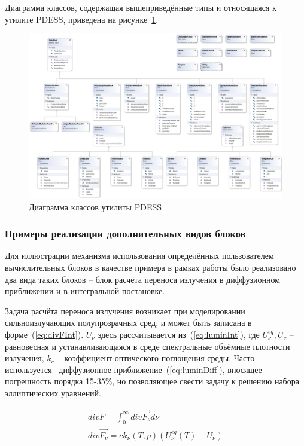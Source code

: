 Диаграмма классов, содержащая вышеприведённые типы и относящаяся к утилите 
PDESS, приведена на рисунке~\ref{fig:classDiagPdess}.

\begin{figure}
    \centering
    \includegraphics[width=\linewidth]{img/classDiag/pdess}
    \caption{Диаграмма классов утилиты PDESS}
    \label{fig:classDiagPdess}
\end{figure}

\subsubsection{Примеры реализации дополнительных видов блоков}
Для иллюстрации механизма использования определённых пользователем 
вычислительных блоков в качестве примера в рамках работы было реализовано два 
вида таких блоков -- блок расчёта переноса излучения в диффузионном приближении 
и в интегральной постановке.

Задача расчёта переноса излучения возникает при моделировании сильноизлучающих 
полупрозрачных сред, и может быть записана в форме~(\ref{eq:divFInt}). 
$U_\nu$ здесь рассчитывается из~(\ref{eq:luminInt}), где $U_\nu^{eq}, U_\nu$ -- 
равновесная и устанавливающаяся в среде спектральные объёмные плотности 
излучения, $k_\nu$ -- коэффициент оптического поглощения среды. Часто 
используется~\cite{gzl} диффузионное приближение~(\ref{eq:luminDiff}), вносящее 
погрешность порядка 15-35\%, но позволяющее свести задачу к решению набора 
эллиптических уравнений.

\begin{equation}
\begin{gathered}
    div F = \int_{0}^{\infty} div \vec{F_\nu} d\nu\\
    div \vec{F_\nu} = c k_\nu (T, p) (U_\nu^{eq}(T) - U_\nu)\\
    \label{eq:divFInt}
\end{gathered}
\end{equation}

